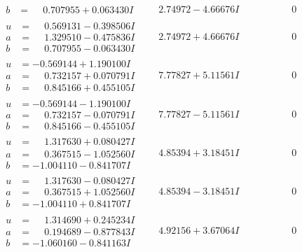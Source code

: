 \documentclass[1p]{elsarticle_modified}
\theoremstyle{definition}
\begin{document}
$$\begin{array}{c|c|c}
\begin{aligned}
b &= \phantom{-}0.707955 + 0.063430 I\end{aligned}
 & \phantom{-}2.74972 - 4.66676 I & \phantom{-0.000000 } 0 \\ \hline\begin{aligned}
u &= \phantom{-}0.569131 - 0.398506 I \\
a &= \phantom{-}1.329510 - 0.475836 I \\
b &= \phantom{-}0.707955 - 0.063430 I\end{aligned}
 & \phantom{-}2.74972 + 4.66676 I & \phantom{-0.000000 } 0 \\ \hline\begin{aligned}
u &= -0.569144 + 1.190100 I \\
a &= \phantom{-}0.732157 + 0.070791 I \\
b &= \phantom{-}0.845166 + 0.455105 I\end{aligned}
 & \phantom{-}7.77827 + 5.11561 I & \phantom{-0.000000 } 0 \\ \hline\begin{aligned}
u &= -0.569144 - 1.190100 I \\
a &= \phantom{-}0.732157 - 0.070791 I \\
b &= \phantom{-}0.845166 - 0.455105 I\end{aligned}
 & \phantom{-}7.77827 - 5.11561 I & \phantom{-0.000000 } 0 \\ \hline\begin{aligned}
u &= \phantom{-}1.317630 + 0.080427 I \\
a &= \phantom{-}0.367515 - 1.052560 I \\
b &= -1.004110 - 0.841707 I\end{aligned}
 & \phantom{-}4.85394 + 3.18451 I & \phantom{-0.000000 } 0 \\ \hline\begin{aligned}
u &= \phantom{-}1.317630 - 0.080427 I \\
a &= \phantom{-}0.367515 + 1.052560 I \\
b &= -1.004110 + 0.841707 I\end{aligned}
 & \phantom{-}4.85394 - 3.18451 I & \phantom{-0.000000 } 0 \\ \hline\begin{aligned}
u &= \phantom{-}1.314690 + 0.245234 I \\
a &= \phantom{-}0.194689 - 0.877843 I \\
b &= -1.060160 - 0.841163 I\end{aligned}
 & \phantom{-}4.92156 + 3.67064 I & \phantom{-0.000000 } 0 \\ \hline\begin{aligned}

\end{aligned}
\end{array}$$
\end{document}
